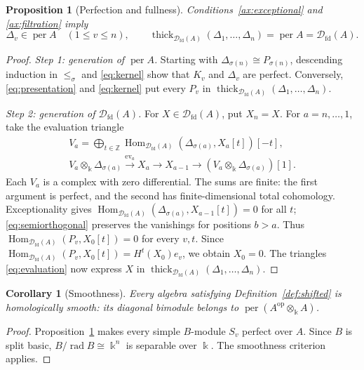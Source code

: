 \documentclass[11pt,a4paper]{article}
\newcommand{\defn}[1]{\textsl{\color{darkblue} #1}}
\newcommand{\D}{\mathcal D}
\newcommand{\ZZ}{\mathbb{Z}}
\newcommand{\op}{\mathrm{op}}
\newcommand{\std}{\Delta}
\DeclareMathOperator{\fd}{fd}
\DeclareMathOperator{\Hom}{Hom}
\DeclareMathOperator{\thick}{thick}
\DeclareMathOperator{\per}{per}
\theoremstyle{plain}
\newtheorem{proposition}[theorem]{Proposition}
\newtheorem{corollary}[theorem]{Corollary}
\theoremstyle{definition}
\numberwithin{equation}{section}
\begin{document}
\begin{proposition}[Perfection and fullness]\label{prop:fullness}
Conditions~\ref{ax:exceptional} and \ref{ax:filtration} imply
\begin{equation}\label{eq:fullness}
 \std_v\in\per A\quad(1\leq v\leq n),\qquad
 \thick_{\D_{\fd}(A)}(\std_1,\ldots,\std_n)
 =\per A=\D_{\fd}(A).
\end{equation}
\end{proposition}
\begin{proof}
\noindent\textit{Step 1: generation of $\per A$.}
Starting with $\std_{\sigma(n)}\cong P_{\sigma(n)}$, descending
induction in $\leq_\sigma$ and \eqref{eq:kernel} show that $K_v$ and
$\std_v$ are perfect. Conversely, \eqref{eq:presentation} and
\eqref{eq:kernel} put every $P_v$ in
$\thick_{\D_{\fd}(A)}(\std_1,\ldots,\std_n)$.

\noindent\textit{Step 2: generation of $\D_{\fd}(A)$.}
For $X\in\D_{\fd}(A)$, put $X_n=X$. For $a=n,\ldots,1$, take the
evaluation triangle
\begin{equation}\label{eq:evaluation}
 \begin{gathered}
 V_a=\bigoplus_{t\in\ZZ}
 \Hom_{\D_{\fd}(A)}(\std_{\sigma(a)},X_a[t])[-t],\\
 V_a\otimes_{\Bbbk}\std_{\sigma(a)}
 \xrightarrow{\mathrm{ev}_a}X_a\longrightarrow X_{a-1}
 \longrightarrow (V_a\otimes_{\Bbbk}\std_{\sigma(a)})[1].
 \end{gathered}
\end{equation}
Each $V_a$ is a complex with zero differential.
The sums are finite: the first argument is perfect, and the second
has finite-dimensional total cohomology. Exceptionality gives
$\Hom_{\D_{\fd}(A)}(\std_{\sigma(a)},X_{a-1}[t])=0$ for all $t$;
\eqref{eq:semiorthogonal} preserves the vanishings for positions
$b>a$. Thus $\Hom_{\D_{\fd}(A)}(P_v,X_0[t])=0$ for every $v,t$.
Since $\Hom_{\D_{\fd}(A)}(P_v,X_0[t])=H^t(X_0)e_v$, we obtain
$X_0=0$. The triangles \eqref{eq:evaluation} now express $X$ in
$\thick_{\D_{\fd}(A)}(\std_1,\ldots,\std_n)$.
\end{proof}

\begin{corollary}[Smoothness]\label{cor:smooth}
Every algebra satisfying Definition~\ref{def:shifted} is
\defn{homologically smooth}: its diagonal bimodule belongs to
$\per(A^{\op}\otimes_{\Bbbk}A)$.
\end{corollary}
\begin{proof}
Proposition~\ref{prop:fullness} makes every simple $B$-module $S_v$
perfect over $A$. Since $B$ is split basic,
$B/\operatorname{rad}B\cong\Bbbk^n$ is separable over $\Bbbk$.
The smoothness criterion \cite[Theorem 5.8]{RS22} applies.
\end{proof}
\end{document}

